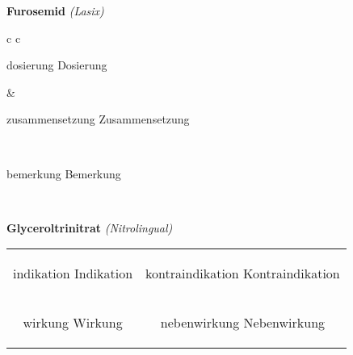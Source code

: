 \documentclass[12pt]{beamer}
\begin{document}
\begin{frame}{
    \textbf{Furosemid}
    \textit{(Lasix)}
}
    \begin{tabular}{c c}
        \begin{beamercolorbox}[wd=\boxwidth\textwidth,ht=\boxheight\textheight,sep=1em]{dosierung}
        Dosierung
        \end{beamercolorbox} & 
        \begin{beamercolorbox}[wd=\boxwidth\textwidth,ht=\boxheight\textheight,sep=1em]{zusammensetzung}
        Zusammensetzung
        \end{beamercolorbox} \\
        \begin{beamercolorbox}[wd=\textwidth,ht=\boxheight\textheight,sep=1em]{bemerkung}
        Bemerkung
        \end{beamercolorbox} \\
    \end{tabular}
\end{frame}

\begin{frame}{
    \textbf{Glyceroltrinitrat}
    \textit{(Nitrolingual)}
}
    \begin{tabular}{c c}
        \begin{beamercolorbox}[wd=\boxwidth\textwidth,ht=\boxheight\textheight,sep=1em]{indikation}
        Indikation
        \end{beamercolorbox} & 
        \begin{beamercolorbox}[wd=\boxwidth\textwidth,ht=\boxheight\textheight,sep=1em]{kontraindikation}
        Kontraindikation 
        \end{beamercolorbox} \\
        \begin{beamercolorbox}[wd=\boxwidth\textwidth,ht=\boxheight\textheight,sep=1em]{wirkung}
        Wirkung
        \end{beamercolorbox} & 
        \begin{beamercolorbox}[wd=\boxwidth\textwidth,ht=\boxheight\textheight,sep=1em]{nebenwirkung}
        Nebenwirkung
        \end{beamercolorbox} \\
    \end{tabular}
\end{frame}
\end{document}
